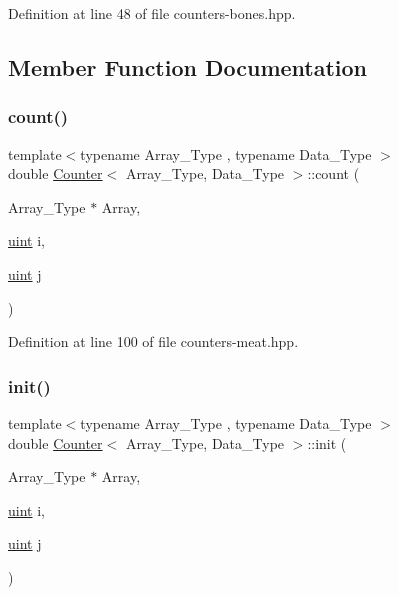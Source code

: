 Definition at line 48 of file counters-\/bones.\+hpp.



\subsection{Member Function Documentation}
\mbox{\label{class_counter_afe1d23e72c3bdca9b2481f36ebde1d95}} 
\subsubsection{\texorpdfstring{count()}{count()}}
{\footnotesize\ttfamily template$<$typename Array\+\_\+\+Type , typename Data\+\_\+\+Type $>$ \\
double \hyperlink{class_counter}{Counter}$<$ Array\+\_\+\+Type, Data\+\_\+\+Type $>$\+::count (\begin{DoxyParamCaption}\item[{Array\+\_\+\+Type $\ast$}]{Array,  }\item[{\hyperlink{typedefs_8hpp_a91ad9478d81a7aaf2593e8d9c3d06a14}{uint}}]{i,  }\item[{\hyperlink{typedefs_8hpp_a91ad9478d81a7aaf2593e8d9c3d06a14}{uint}}]{j }\end{DoxyParamCaption})\hspace{0.3cm}{\ttfamily [inline]}}



Definition at line 100 of file counters-\/meat.\+hpp.

\mbox{\label{class_counter_ae0451979ddc51a5fbf00de78c37d3216}} 
\subsubsection{\texorpdfstring{init()}{init()}}
{\footnotesize\ttfamily template$<$typename Array\+\_\+\+Type , typename Data\+\_\+\+Type $>$ \\
double \hyperlink{class_counter}{Counter}$<$ Array\+\_\+\+Type, Data\+\_\+\+Type $>$\+::init (\begin{DoxyParamCaption}\item[{Array\+\_\+\+Type $\ast$}]{Array,  }\item[{\hyperlink{typedefs_8hpp_a91ad9478d81a7aaf2593e8d9c3d06a14}{uint}}]{i,  }\item[{\hyperlink{typedefs_8hpp_a91ad9478d81a7aaf2593e8d9c3d06a14}{uint}}]{j }\end{DoxyParamCaption})\hspace{0.3cm}{\ttfamily [inline]}}



